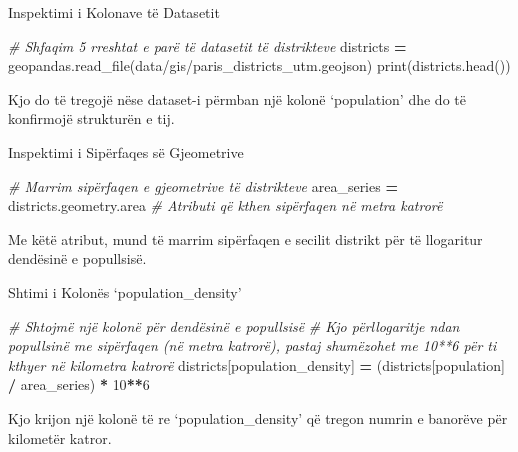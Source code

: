 \documentclass[
  ignorenonframetext,
]{beamer}
\newenvironment{Shaded}{\begin{snugshade}}{\end{snugshade}}
\newcommand{\BuiltInTok}[1]{#1}
\newcommand{\CommentTok}[1]{\textcolor[rgb]{0.56,0.35,0.01}{\textit{#1}}}
\newcommand{\DecValTok}[1]{\textcolor[rgb]{0.00,0.00,0.81}{#1}}
\newcommand{\NormalTok}[1]{#1}
\newcommand{\OperatorTok}[1]{\textcolor[rgb]{0.81,0.36,0.00}{\textbf{#1}}}
\newcommand{\StringTok}[1]{\textcolor[rgb]{0.31,0.60,0.02}{#1}}
\begin{document}
\begin{frame}[fragile]{Inspektimi i Kolonave të Datasetit}
\protect\hypertarget{inspektimi-i-kolonave-tuxeb-datasetit}{}

\begin{Shaded}
\begin{Highlighting}[]
\CommentTok{\# Shfaqim 5 rreshtat e parë të datasetit të distrikteve}
\NormalTok{districts }\OperatorTok{=}\NormalTok{ geopandas.read\_file(}\StringTok{\textquotesingle{}data/gis/paris\_districts\_utm.geojson\textquotesingle{}}\NormalTok{)}
\BuiltInTok{print}\NormalTok{(districts.head())}
\end{Highlighting}
\end{Shaded}

Kjo do të tregojë nëse dataset-i përmban një kolonë `population' dhe do
të konfirmojë strukturën e tij.
\end{frame}

\begin{frame}[fragile]{Inspektimi i Sipërfaqes së Gjeometrive}
\protect\hypertarget{inspektimi-i-sipuxebrfaqes-suxeb-gjeometrive-1}{}

\begin{Shaded}
\begin{Highlighting}[]
\CommentTok{\# Marrim sipërfaqen e gjeometrive të distrikteve}
\NormalTok{area\_series }\OperatorTok{=}\NormalTok{ districts.geometry.area  }\CommentTok{\# Atributi që kthen sipërfaqen në metra katrorë}
\end{Highlighting}
\end{Shaded}

Me këtë atribut, mund të marrim sipërfaqen e secilit distrikt për të
llogaritur dendësinë e popullsisë.
\end{frame}

\begin{frame}[fragile]{Shtimi i Kolonës `population\_density'}
\protect\hypertarget{shtimi-i-kolonuxebs-population_density}{}

\begin{Shaded}
\begin{Highlighting}[]
\CommentTok{\# Shtojmë një kolonë për dendësinë e popullsisë}
\CommentTok{\# Kjo përllogaritje ndan popullsinë me sipërfaqen (në metra katrorë), pastaj shumëzohet me 10**6 për t\textquotesingle{}i kthyer në kilometra katrorë}
\NormalTok{districts[}\StringTok{\textquotesingle{}population\_density\textquotesingle{}}\NormalTok{] }\OperatorTok{=}\NormalTok{ (districts[}\StringTok{\textquotesingle{}population\textquotesingle{}}\NormalTok{] }\OperatorTok{/}\NormalTok{ area\_series) }\OperatorTok{*} \DecValTok{10}\OperatorTok{**}\DecValTok{6}
\end{Highlighting}
\end{Shaded}

Kjo krijon një kolonë të re `population\_density' që tregon numrin e
banorëve për kilometër katror.
\end{frame}
\end{document}
